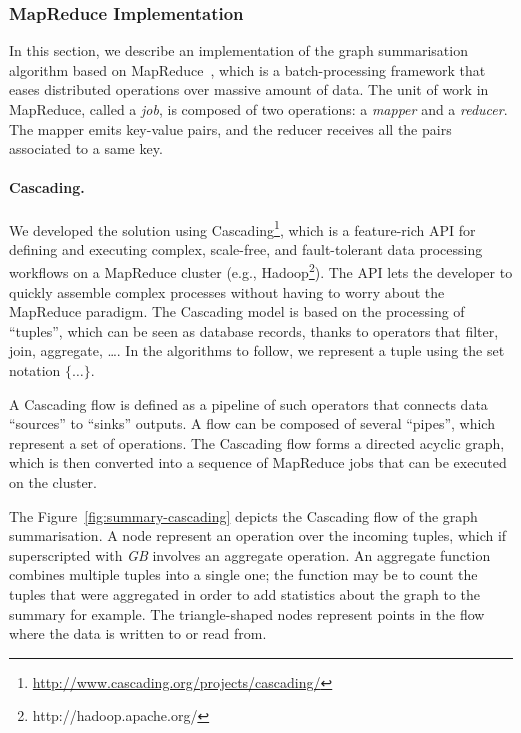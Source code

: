 \subsubsection{MapReduce Implementation}
\label{sec:mapreduce}

In this section, we describe an implementation of the graph summarisation algorithm based on MapReduce~\cite{dean:2004:msd}, which is a batch-processing framework that eases distributed operations over massive amount of data. The unit of work in MapReduce, called a \emph{job}, is composed of two operations: a \emph{mapper} and a \emph{reducer}. The mapper emits key-value pairs, and the reducer receives all the pairs associated to a same key.

\paragraph{Cascading.}

We developed the solution using Cascading\footnote{\url{http://www.cascading.org/projects/cascading/}}, which is a feature-rich API for defining and executing complex, scale-free, and fault-tolerant data processing workflows on a MapReduce cluster (e.g., Hadoop\footnote{http://hadoop.apache.org/}). The API lets the developer to quickly assemble complex processes without having to worry about the MapReduce paradigm. The Cascading model is based on the processing of ``tuples'', which can be seen as database records, thanks to operators that filter, join, aggregate, \ldots.  In the algorithms to follow, we represent a tuple using the set notation $\{\ldots\}$.

A Cascading flow is defined as a pipeline of such operators that connects data ``sources'' to ``sinks'' outputs. A flow can be composed of several ``pipes'', which represent a set of operations. The Cascading flow forms a directed acyclic graph, which is then converted into a sequence of MapReduce jobs that can be executed on the cluster.

The Figure~\ref{fig:summary-cascading} depicts the Cascading flow of the graph summarisation. A node represent an operation over the incoming tuples, which if superscripted with \emph{GB} involves an aggregate operation. An aggregate function combines multiple tuples into a single one; the function may be to count the tuples that were aggregated in order to add statistics about the graph to the summary for example. The triangle-shaped nodes represent points in the flow where the data is written to or read from.

